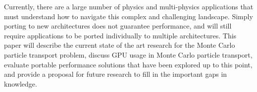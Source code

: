 %
Currently, there are a large number of physics and multi-physics applications that must understand how to navigate this complex and challenging landscape.
%
Simply porting to new architectures does not guarantee performance, and will still require applications to be ported individually to multiple architectures.
%
This paper will describe the current state of the art research for the Monte Carlo particle transport problem, discuss GPU usage in Monte Carlo particle transport, evaluate portable performance solutions that have been explored up to this point, and provide a proposal for future research to fill in the important gaps in knowledge.
%

